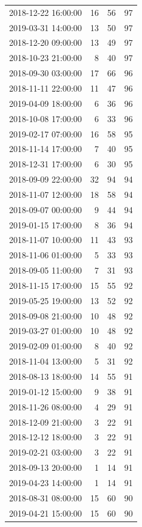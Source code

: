 \begin{tabular}{lrrr}
2018-12-22 16:00:00 & 16 & 56 & 97 \\
2019-03-31 14:00:00 & 13 & 50 & 97 \\
2018-12-20 09:00:00 & 13 & 49 & 97 \\
2018-10-23 21:00:00 & 8 & 40 & 97 \\
2018-09-30 03:00:00 & 17 & 66 & 96 \\
2018-11-11 22:00:00 & 11 & 47 & 96 \\
2019-04-09 18:00:00 & 6 & 36 & 96 \\
2018-10-08 17:00:00 & 6 & 33 & 96 \\
2019-02-17 07:00:00 & 16 & 58 & 95 \\
2018-11-14 17:00:00 & 7 & 40 & 95 \\
2018-12-31 17:00:00 & 6 & 30 & 95 \\
2018-09-09 22:00:00 & 32 & 94 & 94 \\
2018-11-07 12:00:00 & 18 & 58 & 94 \\
2018-09-07 00:00:00 & 9 & 44 & 94 \\
2019-01-15 17:00:00 & 8 & 36 & 94 \\
2018-11-07 10:00:00 & 11 & 43 & 93 \\
2018-11-06 01:00:00 & 5 & 33 & 93 \\
2018-09-05 11:00:00 & 7 & 31 & 93 \\
2018-11-15 17:00:00 & 15 & 55 & 92 \\
2019-05-25 19:00:00 & 13 & 52 & 92 \\
2018-09-08 21:00:00 & 10 & 48 & 92 \\
2019-03-27 01:00:00 & 10 & 48 & 92 \\
2019-02-09 01:00:00 & 8 & 40 & 92 \\
2018-11-04 13:00:00 & 5 & 31 & 92 \\
2018-08-13 18:00:00 & 14 & 55 & 91 \\
2019-01-12 15:00:00 & 9 & 38 & 91 \\
2018-11-26 08:00:00 & 4 & 29 & 91 \\
2018-12-09 21:00:00 & 3 & 22 & 91 \\
2018-12-12 18:00:00 & 3 & 22 & 91 \\
2019-02-21 03:00:00 & 3 & 22 & 91 \\
2018-09-13 20:00:00 & 1 & 14 & 91 \\
2019-04-23 14:00:00 & 1 & 14 & 91 \\
2018-08-31 08:00:00 & 15 & 60 & 90 \\
2019-04-21 15:00:00 & 15 & 60 & 90 \\

\end{tabular}
